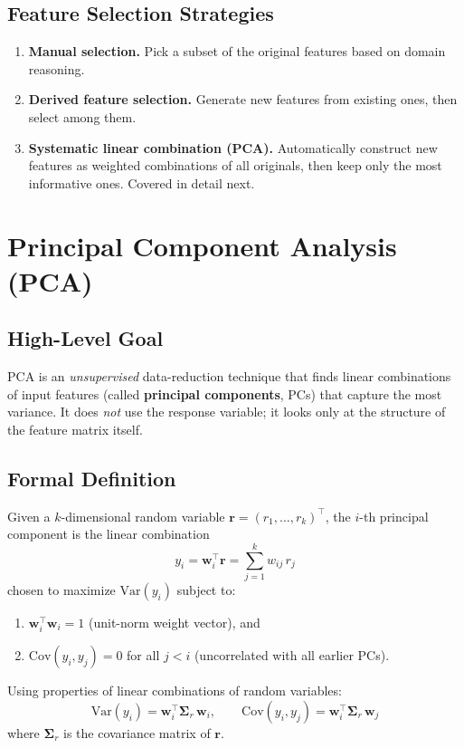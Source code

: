 \documentclass[11pt]{article}
\begin{document}
\subsection{Feature Selection Strategies}
\begin{enumerate}
    \item \textbf{Manual selection.} Pick a subset of the original features based on domain reasoning.
    \item \textbf{Derived feature selection.} Generate new features from existing ones, then select among them.
    \item \textbf{Systematic linear combination (PCA).} Automatically construct new features as weighted combinations of all originals, then keep only the most informative ones. Covered in detail next.
\end{enumerate}

\newpage
\section{Principal Component Analysis (PCA)}
\label{sec:pca}

\subsection{High-Level Goal}
PCA is an \emph{unsupervised} data-reduction technique that finds linear combinations of input features (called \textbf{principal components}, PCs) that capture the most variance. It does \emph{not} use the response variable; it looks only at the structure of the feature matrix itself.

\subsection{Formal Definition}
Given a $k$-dimensional random variable $\mathbf{r} = (r_1, \ldots, r_k)^{\top}$, the $i$-th principal component is the linear combination
\[
  y_i = \mathbf{w}_i^{\top}\mathbf{r} = \sum_{j=1}^{k} w_{ij}\, r_j
\]
chosen to maximize $\mathrm{Var}(y_i)$ subject to:
\begin{enumerate}
    \item $\mathbf{w}_i^{\top}\mathbf{w}_i = 1$ (unit-norm weight vector), and
    \item $\mathrm{Cov}(y_i, y_j) = 0$ for all $j < i$ (uncorrelated with all earlier PCs).
\end{enumerate}
Using properties of linear combinations of random variables:
\[
  \mathrm{Var}(y_i) = \mathbf{w}_i^{\top}\boldsymbol{\Sigma}_r\,\mathbf{w}_i, \qquad
  \mathrm{Cov}(y_i, y_j) = \mathbf{w}_i^{\top}\boldsymbol{\Sigma}_r\,\mathbf{w}_j
\]
where $\boldsymbol{\Sigma}_r$ is the covariance matrix of $\mathbf{r}$.
\end{document}
